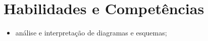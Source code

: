 \section{Habilidades e Competências}
\begin{itemize}
    \item análise e interpretação de diagramas e esquemas;
\end{itemize}
